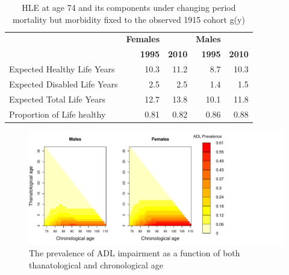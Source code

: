 \documentclass[11pt,oneside,a4paper]{article} %
\begin{document}
\begin{table}[ht]
	\centering
		\begin{tabular}{l|rrrr}
			\toprule
		 \quad & \textbf{Females} & \quad & \textbf{Males} & \quad  \\	
		 \quad & \textbf{1995} & \textbf{2010} & \textbf{1995} & \textbf{2010} \\
	\midrule
	Expected Healthy Life Years&10.3&11.2&8.7&10.3\\
	Expected Disabled Life Years&2.5&2.5&1.4&1.5\\
	Expected Total Life Years&12.7&13.8&10.1&11.8\\
	Proportion of Life healthy&0.81&0.82&0.86&0.88\\

	\bottomrule		
		\end{tabular}
	\caption{HLE at age 74 and its components under changing period mortality but morbidity fixed to the observed 1915 cohort g(y)}
	\label{tab:HLE_HRS}
\end{table}




\begin{figure}
	\centering
		\includegraphics[width=1.1\textwidth]{Figures/Fig_ADL_thana-chrono_rev.pdf}
	\caption{The prevalence of ADL impairment as a function of both thanatological and chronological age}
	\label{fig:ADL_thana-chrono}
\end{figure}
\end{document}
